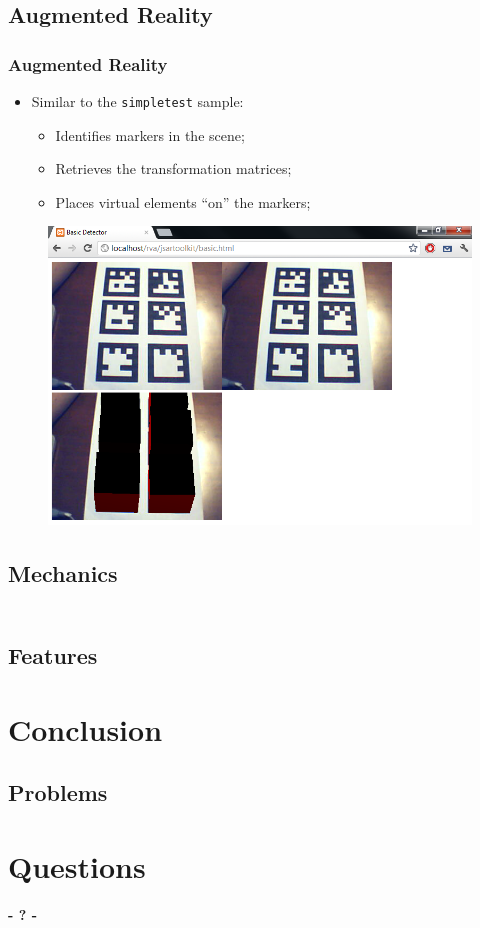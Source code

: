 \documentclass{beamer}
\begin{document}
\subsection{Augmented Reality}
\begin{frame}
	\frametitle{Augmented Reality}
	\begin{itemize}
		\item{Similar to the \texttt{simpletest} sample:
		\begin{itemize}
			\item{Identifies markers in the scene;}
			\item{Retrieves the transformation matrices;}
			\item{Places virtual elements ``on'' the markers;}
		\end{itemize}
		}
	\end{itemize}
	
	\begin{figure}
		\begin{center}
			\includegraphics[width=0.6\linewidth]{slides/images/basic.png}
		\end{center}
	\end{figure}
\end{frame}

\subsection{Mechanics}
\begin{frame}
	\frametitle{}
	\begin{columns}
		\begin{column}{0.5\linewidth}
		\end{column}
		\begin{column}{0.5\linewidth}
		\end{column}
	\end{columns}
\end{frame}

\subsection{Features}

\section{Conclusion}
\subsection{Problems}




\section{Questions}
\begin{frame}
	\titlepage
	\begin{center}
		\Huge\bfseries
		- ? -
	\end{center}
\end{frame}
\end{document}
